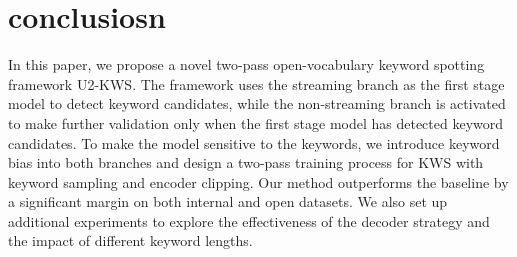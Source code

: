 \documentclass{article}
\begin{document}
\section{conclusiosn}
\label{sec:conclusion}

In this paper, we propose a novel two-pass open-vocabulary keyword spotting framework U2-KWS. The framework uses the streaming branch as the first stage model to detect keyword candidates, while the non-streaming branch is activated to make further validation only when the first stage model has detected keyword candidates. To make the model sensitive to the keywords, we introduce keyword bias into both branches and design a two-pass training process for KWS with keyword sampling and encoder clipping. Our method outperforms the baseline by a significant margin on both internal and open datasets.  We also set up additional experiments to explore the effectiveness of the decoder strategy and the impact of different keyword lengths.












\end{document}

